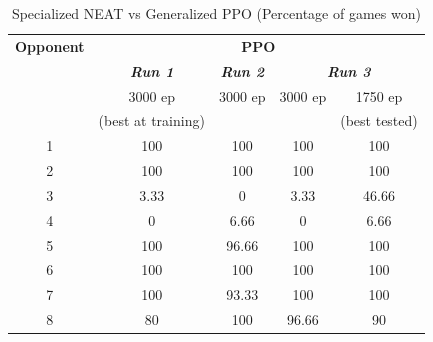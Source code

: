 \documentclass[conference]{IEEEtran}
\begin{document}
    \begin{table}[htbp]
        \caption{Specialized NEAT vs Generalized PPO (Percentage of games won)}
        \begin{center}
            \begin{tabular}{|c|c|c|c|c|}
                \hline
                \textbf{Opponent} & \multicolumn{4}{|c|}{\textbf{PPO}} \\
                \cline{2-5}
                & \textbf{\textit{Run 1}} & \textbf{\textit{Run 2}} & \multicolumn{2}{|c|}{\textbf{\textit{Run 3}}} \\
                \cline{4-5}
                & 3000 ep            & 3000 ep & 3000 ep & 1750 ep       \\
                & (best at training) &         &         & (best tested) \\
                \hline
                1 & 100                & 100     & 100     & 100           \\
                2 & 100                & 100     & 100     & 100           \\
                3 & 3.33               & 0       & 3.33    & 46.66         \\
                4 & 0                  & 6.66    & 0       & 6.66          \\
                5 & 100                & 96.66   & 100     & 100           \\
                6 & 100                & 100     & 100     & 100           \\
                7 & 100                & 93.33   & 100     & 100           \\
                8 & 80                 & 100     & 96.66   & 90            \\
                \hline

            \end{tabular}
        \end{center}
    \end{table}
\end{document}
